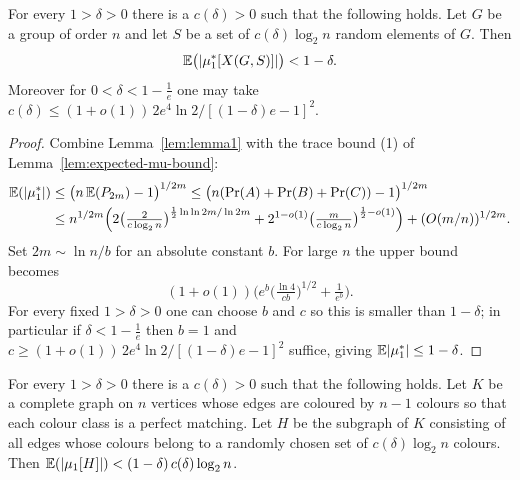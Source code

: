 \begin{theorem}
  \label{thm:theorem1}
  For every $1 > \delta > 0$ there is a $c(\delta) > 0$ such that the following
  holds. Let $G$ be a group of order $n$ and let $S$ be a set of
  $c(\delta)\log_2 n$ random elements of $G$. Then
  \[
    \mathbb{E}\big(|\mu_{1}^{*}[X(G,S)]|\big) < 1 - \delta.
  \]
  Moreover for $0 < \delta < 1 - \tfrac1e$ one may take
  $c(\delta) \le (1 + o(1))\,2e^4\ln 2 / [(1-\delta)e - 1]^2$.
\end{theorem}
\begin{proof}
  Combine Lemma~\ref{lem:lemma1} with the trace bound (1) of
  Lemma~\ref{lem:expected-mu-bound}:
  \begin{align*}
    \mathbb{E}(|\mu_{1}^{*}|)
      &\le \big(n\,\mathbb{E}(P_{2m}) - 1\big)^{1/2m}
       \le \big(n(\operatorname{Pr}(A)+\operatorname{Pr}(B)+\operatorname{Pr}(C)) - 1\big)^{1/2m} \\
      &\le n^{1/2m}\Big(2\big(\tfrac{2}{c\log_2 n}\big)^{\frac12 \ln\ln 2m/\ln 2m}
            + 2^{1-o(1)}\big(\tfrac{m}{c\log_2 n}\big)^{\frac12 - o(1)}\Big)
            + (O(m/n))^{1/2m}.
  \end{align*}
  Set $2m \sim \ln n / b$ for an absolute constant $b$. For large $n$ the upper
  bound becomes
  \[
    (1 + o(1))\Big(e^{b}\big(\tfrac{\ln 4}{cb}\big)^{1/2} + \tfrac{1}{e^{b}}\Big).
  \]
  For every fixed $1 > \delta > 0$ one can choose $b$ and $c$ so this is smaller
  than $1 - \delta$; in particular if $\delta < 1 - \tfrac1e$ then $b = 1$ and
  $c \ge (1+o(1))\,2e^4\ln 2 / [(1-\delta)e - 1]^2$ suffice, giving
  $\mathbb{E}|\mu_{1}^{*}| \le 1 - \delta$.
\end{proof}

\begin{proposition}
  \label{prop:prop1}
  \notready
  For every $1 > \delta > 0$ there is a $c(\delta) > 0$ such that the following
  holds. Let $K$ be a complete graph on $n$ vertices whose edges are coloured by
  $n - 1$ colours so that each colour class is a perfect matching. Let $H$ be the
  subgraph of $K$ consisting of all edges whose colours belong to a randomly
  chosen set of $c(\delta)\log_2 n$ colours. Then
  $\mathbb{E}(|\mu_{1}[H]|) < (1-\delta)\,c(\delta)\log_2 n$.
\end{proposition}

